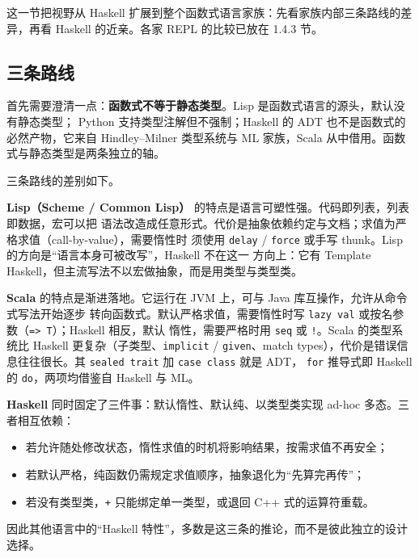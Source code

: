 这一节把视野从 Haskell 扩展到整个函数式语言家族：先看家族内部三条路线的差异，再看
Haskell 的近亲。各家 REPL 的比较已放在 1.4.3 节。

\subsection{三条路线}\label{ux4e09ux6761ux8defux7ebf}

首先需要澄清一点：\textbf{函数式不等于静态类型}。Lisp 是函数式语言的源头，默认没有静态类型；
Python 支持类型注解但不强制；Haskell 的 ADT 也不是函数式的必然产物，它来自 Hindley--Milner
类型系统与 ML 家族，Scala 从中借用。函数式与静态类型是两条独立的轴。

三条路线的差别如下。

\textbf{Lisp（Scheme / Common Lisp）} 的特点是语言可塑性强。代码即列表，列表即数据，宏可以把
语法改造成任意形式。代价是抽象依赖约定与文档；求值为严格求值（call-by-value），需要惰性时
须使用 \passthrough{\lstinline!delay!} / \passthrough{\lstinline!force!} 或手写 thunk。Lisp 的方向是“语言本身可被改写”，Haskell 不在这一
方向上：它有 Template Haskell，但主流写法不以宏做抽象，而是用类型与类型类。

\textbf{Scala} 的特点是渐进落地。它运行在 JVM 上，可与 Java 库互操作，允许从命令式写法开始逐步
转向函数式。默认严格求值，需要惰性时写 \passthrough{\lstinline!lazy val!} 或按名参数（\passthrough{\lstinline!=> T!}）；Haskell 相反，默认
惰性，需要严格时用 \passthrough{\lstinline!seq!} 或 \passthrough{\lstinline"!"}。Scala 的类型系统比 Haskell 更复杂（子类型、\passthrough{\lstinline!implicit!} /
\passthrough{\lstinline!given!}、match types），代价是错误信息往往很长。其 \passthrough{\lstinline!sealed trait!} 加 \passthrough{\lstinline!case class!} 就是 ADT，
\passthrough{\lstinline!for!} 推导式即 Haskell 的 \passthrough{\lstinline!do!}，两项均借鉴自 Haskell 与 ML。

\textbf{Haskell} 同时固定了三件事：默认惰性、默认纯、以类型类实现 ad-hoc 多态。三者相互依赖：

\begin{itemize}
\tightlist
\item
  若允许随处修改状态，惰性求值的时机将影响结果，按需求值不再安全；
\item
  若默认严格，纯函数仍需规定求值顺序，抽象退化为“先算完再传”；
\item
  若没有类型类，\passthrough{\lstinline!+!} 只能绑定单一类型，或退回 C++ 式的运算符重载。
\end{itemize}

因此其他语言中的“Haskell 特性”，多数是这三条的推论，而不是彼此独立的设计选择。

